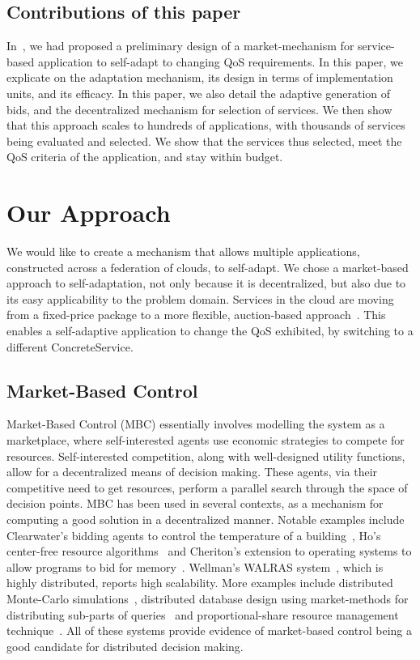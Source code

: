\documentclass[10pt,journal,compsoc]{IEEEtran}
\begin{document}
\subsection{Contributions of this paper}
In~\cite{Nallur2010Design}, we had proposed a preliminary design of a market-mechanism for service-based application to self-adapt to changing QoS requirements. In this paper, we explicate on the adaptation mechanism, its design in terms of implementation units, and its efficacy.  In this paper, we also detail the adaptive generation of bids, and the decentralized mechanism for selection of services. We then show that this approach scales to hundreds of applications, with thousands of services being evaluated and selected. We show that the services thus selected, meet the QoS criteria of the application, and stay within budget. 
  
\section{Our Approach}
We would like to create a mechanism that allows multiple applications, constructed across a federation of clouds, to self-adapt. We chose a market-based approach to self-adaptation, not only because it is decentralized, but also due to its easy applicability to the problem domain. Services in the cloud are moving from a fixed-price package to a more flexible, auction-based approach~\cite{Amazon2010SpotInstance}. This enables a self-adaptive application to change the QoS exhibited, by switching to a different ConcreteService. 
\subsection{Market-Based Control}
Market-Based Control (MBC) essentially involves modelling the system as a marketplace, where self-interested agents use economic strategies to compete for resources. Self-interested competition, along with well-designed utility functions, allow for a decentralized means of decision making. These agents, via their competitive need to get resources, perform a parallel search through the space of decision points. MBC has been used in several contexts, as a mechanism for computing a good solution in a decentralized manner. Notable examples include Clearwater's bidding agents to control the temperature of a building~\cite{Clearwater1996Saving}, Ho's center-free resource algorithms~\cite{Ho1980class} and Cheriton's extension to operating systems to allow programs to bid for memory~\cite{Harty1996market}. Wellman's WALRAS system~\cite{Wellman1993market-oriented}, which is highly distributed, reports high scalability. More examples include distributed Monte-Carlo simulations~\cite{Waldspurger1992Spawn}, distributed database design using market-methods for distributing sub-parts of queries~\cite{Stonebraker1994Economic} and proportional-share resource management technique~\cite{Waldspurger1994Lottery}. All of these systems provide evidence of market-based control being a good candidate for distributed decision making. 
\end{document}
